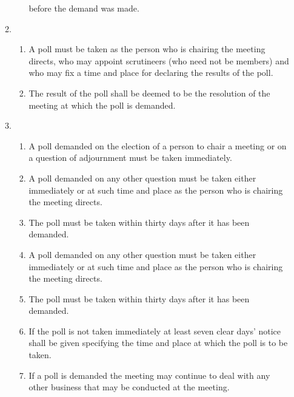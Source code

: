 \documentclass{article}
\begin{document}
\begin{enumerate}[label=\arabic*]
\begin{enumerate}[label=(\arabic*)]
\begin{enumerate}[label=(\alph*)]
            before the demand was made.
        \end{enumerate}
        \item \begin{enumerate}[label=(\alph*)]
            \item A poll must be taken as the person who is chairing the
            meeting directs, who may appoint scrutineers (who need
            not be members) and who may fix a time and place for
            declaring the results of the poll.
            \item The result of the poll shall be deemed to be the resolution
            of the meeting at which the poll is demanded.
        \end{enumerate}
        \item \begin{enumerate}[label=(\alph*)]
            \item A poll demanded on the election of a person to chair
            a meeting or on a question of adjournment must be
            taken immediately.
            \item A poll demanded on any other question must be taken
            either immediately or at such time and place as the
            person who is chairing the meeting directs.
            \item The poll must be taken within thirty days after it has
            been demanded.
            \item A poll demanded on any other question must be taken
            either immediately or at such time and place as the
            person who is chairing the meeting directs.
            \item The poll must be taken within thirty days after it has
            been demanded.
            \item If the poll is not taken immediately at least seven clear
            days’ notice shall be given specifying the time and place
            at which the poll is to be taken.
            \item If a poll is demanded the meeting may continue to
            deal with any other business that may be conducted at
            the meeting.
        \end{enumerate}
    \end{enumerate}
    

\end{enumerate}
\end{document}
